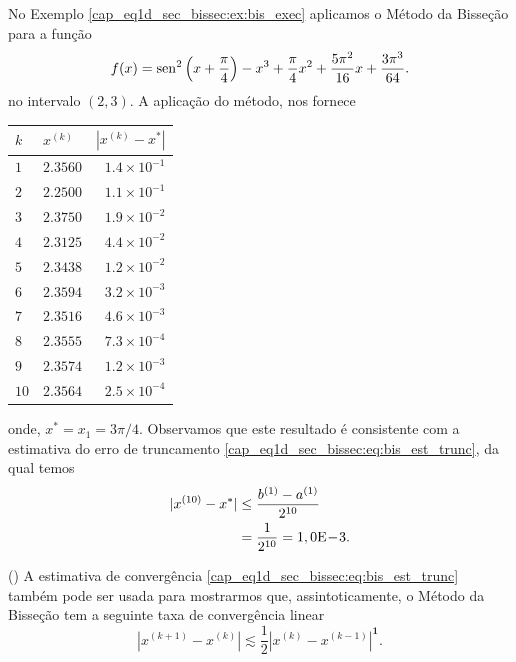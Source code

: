 \begin{ex}\label{cap_eq1d_sec_bissec:ex:bis_convp}
  No Exemplo \ref{cap_eq1d_sec_bissec:ex:bis_exec} aplicamos o Método da Bisseção para a função
\begin{equation}
  f(x) = \operatorname{sen}^2\left(x+\frac{\pi}{4}\right) - x^3 + \frac{\pi}{4}x^2 + \frac{5\pi^2}{16}x + \frac{3\pi^3}{64}.
\end{equation}
no intervalo $(2, 3)$. A aplicação do método, nos fornece
\begin{center}
  \begin{tabular}[H]{llr}
    $k$ & $x^{(k)}$ & $\left|x^{(k)}-x^{*}\right|$\\\hline
    $1$ & $2.3560$ & $1.4\times 10^{-1}$ \\
    $2$ & $2.2500$ & $1.1\times 10^{-1}$ \\
    $3$ & $2.3750$ & $1.9\times 10^{-2}$ \\
    $4$ & $2.3125$ & $4.4\times 10^{-2}$ \\
    $5$ & $2.3438$ & $1.2\times 10^{-2}$ \\
    $6$ & $2.3594$ & $3.2\times 10^{-3}$ \\
    $7$ & $2.3516$ & $4.6\times 10^{-3}$ \\
    $8$ & $2.3555$ & $7.3\times 10^{-4}$ \\
    $9$ & $2.3574$ & $1.2\times 10^{-3}$ \\
    $10$ & $2.3564$ & $2.5\times 10^{-4}$ \\\hline
  \end{tabular}
\end{center}
onde, $x^* = x_1 = 3\pi/4$. Observamos que este resultado é consistente com a estimativa do erro de truncamento \eqref{cap_eq1d_sec_bissec:eq:bis_est_trunc}, da qual temos
\begin{align}
  |x^{(10)} - x^*| &\leq \frac{b^{(1)}-a^{(1)}}{2^{10}}\\
                   &= \frac{1}{2^{10}} = 1,0\mathrm{E}\!-\!3.
\end{align}
\end{ex}

\begin{obs}()
  A estimativa de convergência \eqref{cap_eq1d_sec_bissec:eq:bis_est_trunc} também pode ser usada para mostrarmos que, assintoticamente, o Método da Bisseção tem a seguinte taxa de convergência linear
  \begin{equation}
    \left|x^{(k+1)} - x^{(k)}\right| \lesssim \frac{1}{2}\left|x^{(k)} - x^{(k-1)}\right|^{\pmb{1}}.
  \end{equation}
\end{obs}

